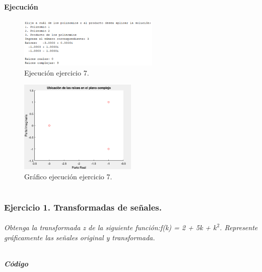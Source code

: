 \documentclass[a4paper, 12pt]{article}
\begin{document}
        \subsection{Ejecución}
	\begin{figure}[ht]
		\centering
		\includegraphics[width=0.6\textwidth]{figures/ejc7.png}
		\caption{Ejecución ejercicio 7.}
		\label{ejec7}
	\end{figure}
	\begin{figure}[ht]
		\centering
		\includegraphics[width=0.5\textwidth]{figures/graf7.png}
		\caption{Gráfico ejecución ejercicio 7.}
		\label{grafica7}
	\end{figure}

    \newpage
    \part{}
    
    \section{Ejercicio 1. Transformadas de señales.}
    \subsection{}
	\paragraph{Obtenga la transformada z de la siguiente función:f(k) = 2 + 5k + $k^{2}$. Represente gráficamente las señales original y transformada.}
    \subsubsection*{Código}
	\inputminted[fontsize=\scriptsize, linenos, breaklines=true, xleftmargin=0.75cm, frame=lines]{matlab}{code/parte2/Ej1p1.m}
\end{document}
